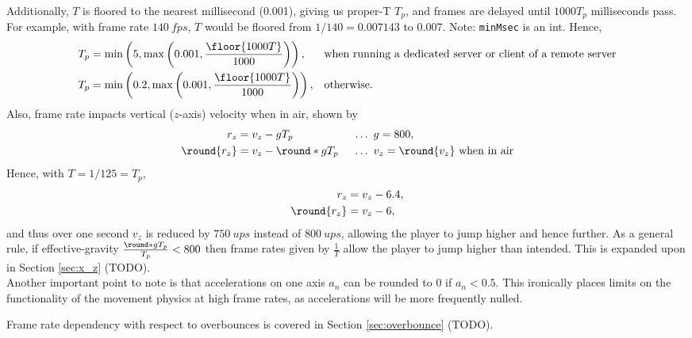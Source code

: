 Additionally, $T$ is floored to the nearest millisecond (0.001), giving us proper-T $T_p$, and frames are delayed until $1000T_p$ milliseconds pass.
For example, with frame rate $\qty{140}{fps}$, $T$ would be floored from $1/140 = 0.007143$ to 0.007. Note: \texttt{minMsec} is an int.
Hence,
\begin{align*}
T_p &= \min\left(5, \max\left(0.001, \frac{\floor{1000T}}{1000} \right) \right), &&\text{when running a dedicated server or client of a remote server}\\
T_p &= \min\left(0.2, \max\left(0.001, \frac{\floor{1000T}}{1000} \right) \right), &&\text{otherwise.}
\end{align*}
Also, frame rate impacts vertical ($z$-axis) velocity when in air, shown by
\begin{align*}
r_z &= v_z - gT_p\ &&\ldots\ g = 800,\\
\round{r_z} &= v_z - \round*{gT_p}\ &&\ldots\ v_z = \round{v_z}\ \text{when in air}
\end{align*}
Hence, with $T = 1/125 = T_p$,
\begin{align*}
r_z &= v_z - 6.4,\\
\round{r_z} &= v_z - 6,
\end{align*}
and thus over one second $v_z$ is reduced by $\qty{750}{ups}$ instead of $\qty{800}{ups}$, allowing the player to jump higher and hence further.
As a general rule, if effective-gravity $\frac{\round*{gT_p}}{T_p} < 800$ then frame rates given by $\frac{1}{T}$ allow the player to jump higher than intended.
This is expanded upon in Section \ref{sec:x_z} (TODO).\\

Another important point to note is that accelerations on one axis $a_n$ can be rounded to 0 if $a_n < 0.5$.
This ironically places limits on the functionality of the movement physics at high frame rates, as accelerations will be more frequently nulled.


Frame rate dependency with respect to overbounces is covered in Section \ref{sec:overbounce} (TODO).


